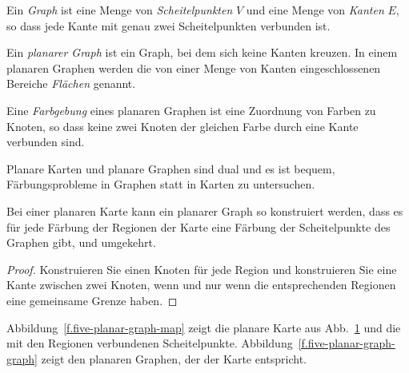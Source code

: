 \begin{figure}[t]
{
}
\label{f.five-planar-map-five}
\label{f.five-planar-map-four}
\end{figure}

\begin{definition}
Ein \emph{Graph} ist eine Menge von \emph{Scheitelpunkten} $V$ und eine Menge von \emph{Kanten} $E$, so dass jede Kante mit genau zwei Scheitelpunkten verbunden ist.

Ein \emph{planarer Graph} ist ein Graph, bei dem sich keine Kanten kreuzen. In einem planaren Graphen werden die von einer Menge von Kanten eingeschlossenen Bereiche \emph{Flächen} genannt.

Eine \emph{Farbgebung} eines planaren Graphen ist eine Zuordnung von Farben zu Knoten, so dass keine zwei Knoten der gleichen Farbe durch eine Kante verbunden sind.
\end{definition}

Planare Karten und planare Graphen sind dual und es ist bequem, Färbungsprobleme in Graphen statt in Karten zu untersuchen.

\begin{theorem}
Bei einer planaren Karte kann ein planarer Graph so konstruiert werden, dass es für jede Färbung der Regionen der Karte eine Färbung der Scheitelpunkte des Graphen gibt, und umgekehrt.
\end{theorem}

\begin{proof}
Konstruieren Sie einen Knoten für jede Region und konstruieren Sie eine Kante zwischen zwei Knoten, wenn und nur wenn die entsprechenden Regionen eine gemeinsame Grenze haben. 
\end{proof}

\begin{example}
Abbildung~\ref{f.five-planar-graph-map} zeigt die planare Karte aus Abb.~\ref{f.five-planar-map-four} und die mit den Regionen verbundenen Scheitelpunkte. Abbildung~\ref{f.five-planar-graph-graph} zeigt den planaren Graphen, der der Karte entspricht.
\end{example}

